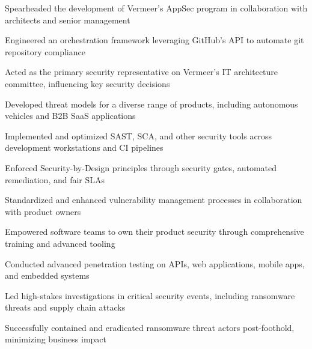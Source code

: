 \item Spearheaded the development of Vermeer's AppSec program in collaboration with architects and senior management
\item Engineered an orchestration framework leveraging GitHub's API to automate git repository compliance
\item Acted as the primary security representative on Vermeer's IT architecture committee, influencing key security decisions
\item Developed threat models for a diverse range of products, including autonomous vehicles and B2B SaaS applications
\item Implemented and optimized SAST, SCA, and other security tools across development workstations and CI pipelines
\item Enforced Security-by-Design principles through security gates, automated remediation, and fair SLAs
\item Standardized and enhanced vulnerability management processes in collaboration with product owners
\item Empowered software teams to own their product security through comprehensive training and advanced tooling
\item Conducted advanced penetration testing on APIs, web applications, mobile apps, and embedded systems
\item Led high-stakes investigations in critical security events, including ransomware threats and supply chain attacks
\item Successfully contained and eradicated ransomware threat actors post-foothold, minimizing business impact